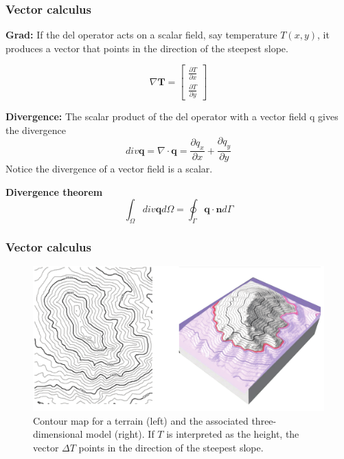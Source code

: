 \documentclass[notes]{beamer}
\begin{document}
\begin{frame}
	\frametitle{Vector calculus}
	
	
	\textbf{Grad:} If the del operator acts on a scalar field, say temperature $T(x, y)$, it produces a vector
	that points in the direction of the steepest slope.
	
	\begin{equation*}
	\nabla \mathbf{T} =  
	\begin{bmatrix} 
	\frac{\partial T}{\partial x} \\
	\frac{\partial T}{\partial y}
	\end{bmatrix}
	\end{equation*}
	
	\textbf{Divergence:} The scalar product of the del operator with a vector field q gives the divergence
	\begin{equation*}
	div \mathbf{q} = \nabla \cdot \mathbf{q} = \frac{\partial q_x}{\partial x} + \frac{\partial q_y}{\partial y}
	\end{equation*}
	Notice the divergence of a vector field is a scalar.
	
	\textbf{Divergence theorem}
	\begin{equation*}
	\int_\Omega div \mathbf{q} d\Omega = \oint_\Gamma \mathbf{q}\cdot \mathbf{n} d\Gamma
	\end{equation*}
\end{frame}


\begin{frame}
	\frametitle{Vector calculus}
	\begin{figure}
		\centering
		\includegraphics[width=\textwidth]{figs/grad-vector.png}
		\caption*{Contour map for a terrain (left) and the associated three-dimensional model (right). If $T$
			is interpreted as the height, the vector $\Delta T$ points in the direction of the steepest slope.}
	\end{figure}
\end{frame}
\end{document}
